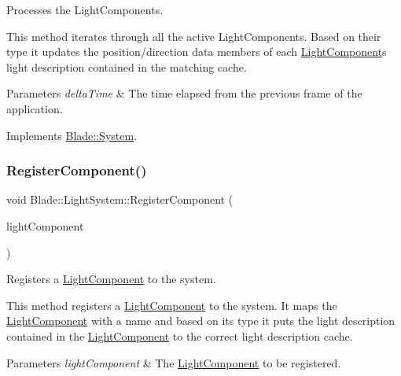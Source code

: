 Processes the Light\+Components. 

This method iterates through all the active Light\+Components. Based on their type it updates the position/direction data members of each \hyperlink{class_blade_1_1_light_component}{Light\+Component}\textquotesingle{}s light description contained in the matching cache. 
\begin{DoxyParams}{Parameters}
{\em delta\+Time} & The time elapsed from the previous frame of the application. \\
\hline
\end{DoxyParams}


Implements \hyperlink{class_blade_1_1_system_a80c186f5f9f8fa4fd317b861853fe6a8}{Blade\+::\+System}.

\mbox{\label{class_blade_1_1_light_system_a0d98342c2927dd165f41ccb50d4845ab}} 
\subsubsection{\texorpdfstring{Register\+Component()}{RegisterComponent()}}
{\footnotesize\ttfamily void Blade\+::\+Light\+System\+::\+Register\+Component (\begin{DoxyParamCaption}\item[{\hyperlink{class_blade_1_1_light_component}{Light\+Component} $\ast$}]{light\+Component }\end{DoxyParamCaption})\hspace{0.3cm}{\ttfamily [noexcept]}}



Registers a \hyperlink{class_blade_1_1_light_component}{Light\+Component} to the system. 

This method registers a \hyperlink{class_blade_1_1_light_component}{Light\+Component} to the system. It maps the \hyperlink{class_blade_1_1_light_component}{Light\+Component} with a name and based on it\textquotesingle{}s type it puts the light description contained in the \hyperlink{class_blade_1_1_light_component}{Light\+Component} to the correct light description cache. 
\begin{DoxyParams}{Parameters}
{\em light\+Component} & The \hyperlink{class_blade_1_1_light_component}{Light\+Component} to be registered. \\
\hline
\end{DoxyParams}
\mbox{\label{class_blade_1_1_light_system_a7f7a3500b1177ebde379b7fd54b3d16a}} 
